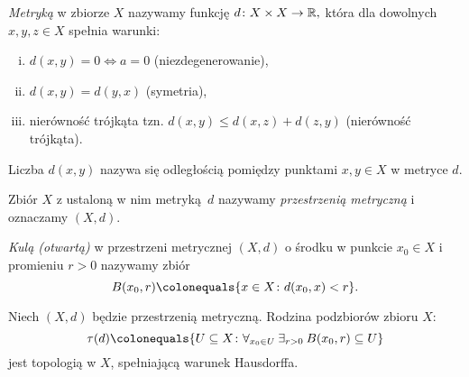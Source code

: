 {\begin{definition}
    \end{definition}
    \begin{definition}[Metryka]
        \label{def:metric}
        \emph{Metryką} w zbiorze $X$ nazywamy funkcję $d\colon X\times X\rightarrow \mathbb{R},$ która dla dowolnych $x, y, z\in X$ spełnia warunki:
        \begin{enumerate}[(i)]
            \item $d(x, y) = 0 \iff a = 0$ (niezdegenerowanie),
            \item $d(x, y) = d(y, x)$ (symetria),
            \item nierówność trójkąta tzn. $d(x, y) \leq d(x, z) + d(z, y)$ (nierówność trójkąta).
        \end{enumerate}            
    \end{definition}
    Liczba $d(x, y)$ nazywa się odległością pomiędzy punktami $x, y\in X$ w metryce $d$.
    \begin{definition}
        \label{def:metric_space}
        Zbiór $X$ z ustaloną w nim metryką~$d$ nazywamy \emph{przestrzenią metryczną} i oznaczamy $(X, d)$.
    \end{definition}
    \begin{definition}[Kula]
        \label{def:ball}
        \emph{Kulą (otwartą)} w przestrzeni metrycznej $(X, d)$ o środku w punkcie $x_0\in X$ i promieniu $r > 0$ nazywamy zbiór
        \begin{equation}
            B(x_0, r) \colonequals \{x\in X\colon d(x_0, x) < r\}.
        \end{equation}
    \end{definition}
    \begin{statement}
        Niech $(X, d)$ będzie przestrzenią metryczną. Rodzina podzbiorów zbioru $X$:
        \begin{equation}
            \tau(d) \colonequals \{U\subseteq X\colon\nforall{x_0\in U}\nexists{r>0} B(x_0, r)\subseteq U\}
        \end{equation}
        jest topologią w $X$, spełniającą warunek Hausdorffa.
    \end{statement}
}